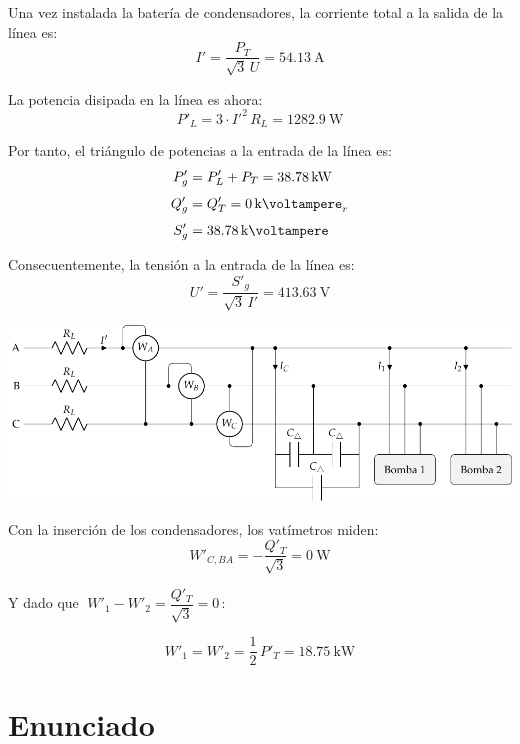Una vez instalada la batería de condensadores, la corriente total a la salida de la línea es:
\[
I' = \frac{P_T}{\sqrt{3} \, U} = \SI{54.13}{\ampere}
\]

La potencia disipada en la línea es ahora:
\[
P'_L = 3 \cdot I'^2 \, R_L = \SI{1282.9}{\watt} 
\]

Por tanto, el triángulo de potencias a la entrada de la línea es:
\begin{align*}
P'_g &= P'_L + P_T = \SI{38.78}{\kilo\watt}\\[3pt]
Q'_g &= Q'_T = \SI{0}{\kilo\voltampere}_r\\[3pt]
S'_g &= \SI{38.78}{\kilo\voltampere}
\end{align*}

Consecuentemente, la tensión a la entrada de la línea es:
\[
U' = \frac{S'_g}{\sqrt{3} \, I'} = \SI{413.63}{\volt}
\]

\begin{center}
    \includegraphics[width=1\textwidth]{figuras/BT3_ej5_bombas_condensadores_vat.pdf}
\end{center}

\vspace{2mm}
Con la inserción de los condensadores, los vatímetros miden:
\[
    W'_{C, BA} = - \frac{Q'_T}{\sqrt{3}} = \SI{0}{\watt}
\]

\vspace{-2mm}
Y dado que $\; W'_1 - W'_2 = \dfrac{Q'_T}{\sqrt{3}} = 0 \,$:

\[
    W'_1 = W'_2 = \frac{1}{2} \, P'_T = \SI{18.75}{\kilo\watt}
\]



\section{Enunciado}

